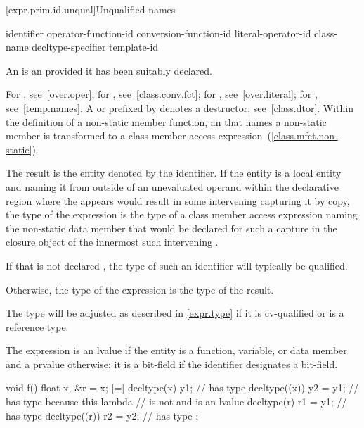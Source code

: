 [expr.prim.id.unqual]{Unqualified names}

\begin{bnf}
\br
    identifier\br
    operator-function-id\br
    conversion-function-id\br
    literal-operator-id\br
    \terminal{\~} class-name\br
    \terminal{\~} decltype-specifier\br
    template-id
\end{bnf}

\pnum
{}%
An  is an  provided it has
been suitably declared.
\begin{note}
For , see~\ref{over.oper}; for
, see~\ref{class.conv.fct}; for
, see~\ref{over.literal}; for
, see~\ref{temp.names}. A 
or 
prefixed by \tcode{\~} denotes a destructor; see~\ref{class.dtor}.
Within the definition of a non-static member function, an
 that names a non-static member is transformed to a
class member access expression~(\ref{class.mfct.non-static}).
\end{note}

\pnum
The result is the entity denoted by the identifier.
If the entity is a local entity
and naming it from outside of an unevaluated operand
within the declarative region where the  appears
would result in some intervening 
capturing it by copy,
the type of the expression is
the type of a class member access expression
naming the non-static data member
that would be declared for such a capture
in the closure object of
the innermost such intervening .
\begin{note}
If that  is not declared ,
the type of such an identifier will typically be  qualified.
\end{note}
Otherwise, the type of the expression is the type of the result.
\begin{note}
The type will be adjusted as described in \ref{expr.type}
if it is cv-qualified or is a reference type.
\end{note}
The expression is an lvalue
if the entity is a function, variable, or data member
and a prvalue otherwise;
it is a bit-field if the identifier designates a bit-field.
\begin{example}
\begin{codeblock}
void f() {
  float x, &r = x;
  [=] {
    decltype(x) y1;             //  has type 
    decltype((x)) y2 = y1;      //  has type  because this lambda
                                // is not  and  is an lvalue
    decltype(r) r1 = y1;        //  has type 
    decltype((r)) r2 = y2;      //  has type 
  };
}
\end{codeblock}
\end{example}

